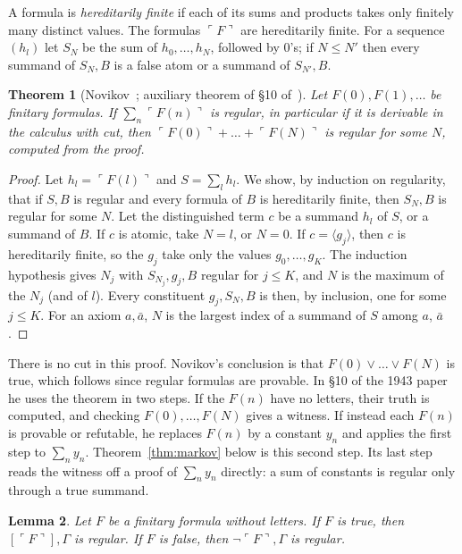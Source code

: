 \documentclass[11pt]{amsart}
\newtheorem{theorem}{Theorem}[section]
\newtheorem{lemma}[theorem]{Lemma}
\theoremstyle{definition}
\theoremstyle{remark}
\newcommand{\seq}[1]{\langle #1\rangle}
\newcommand{\one}[1]{[#1]}
\begin{document}
A formula is \emph{hereditarily finite} if each of its sums and products
takes only finitely many distinct values. The formulas
$\ulcorner F\urcorner$ are hereditarily finite. For a sequence $(h_l)$ let
$S_N$ be the sum of $h_0,\dots,h_N$, followed by $0$'s; if $N\le N'$ then
every summand of $S_N,B$ is a false atom or a summand of $S_{N'},B$.

\begin{theorem}[Novikov~\cite{Novikov39}; auxiliary theorem of \S10 of~\cite{Novikov}]\label{thm:1939}
  Let $F(0),F(1),\dots$ be finitary formulas. If
  $\sum_n\ulcorner F(n)\urcorner$ is regular, in particular if it is
  derivable in the calculus with cut, then
  $\ulcorner F(0)\urcorner+\dots+\ulcorner F(N)\urcorner$ is regular for
  some $N$, computed from the proof.
\end{theorem}

\begin{proof}
  Let $h_l=\ulcorner F(l)\urcorner$ and $S=\sum_lh_l$. We show, by
  induction on regularity, that if $S,B$ is regular and every formula of
  $B$ is hereditarily finite, then $S_N,B$ is regular for some $N$. Let
  the distinguished term $c$ be a summand $h_l$ of $S$, or a summand of
  $B$. If $c$ is atomic, take $N=l$, or $N=0$. If $c=\seq{g_j}$, then
  $c$ is hereditarily finite, so the $g_j$ take only the values
  $g_0,\dots,g_K$. The induction hypothesis gives $N_j$ with $S_{N_j},g_j,B$
  regular for $j\le K$, and $N$ is the maximum of the $N_j$ (and of $l$).
  Every constituent $g_j,S_N,B$ is then, by inclusion, one for some
  $j\le K$. For an axiom $a,\bar a$, $N$ is the largest index of a summand
  of $S$ among $a$, $\bar a$.
\end{proof}

There is no cut in this proof. Novikov's conclusion is that
$F(0)\vee\dots\vee F(N)$ is true, which follows since regular formulas are
provable. In \S10 of the 1943 paper he uses the theorem in two steps. If
the $F(n)$ have no letters, their truth is computed, and checking
$F(0),\dots,F(N)$ gives a witness. If instead each $F(n)$ is provable or
refutable, he replaces $F(n)$ by a constant $y_n$ and applies the first
step to $\sum_ny_n$. Theorem~\ref{thm:markov} below is this second step.
Its last step reads the witness off a proof of $\sum_ny_n$ directly: a sum
of constants is regular only through a true summand.

\begin{lemma}\label{lem:dec}
  Let $F$ be a finitary formula without letters. If $F$ is true, then
  $\one{\ulcorner F\urcorner},\Gamma$ is regular. If
  $F$ is false, then $\neg\ulcorner F\urcorner,\Gamma$ is regular.
\end{lemma}
\end{document}
